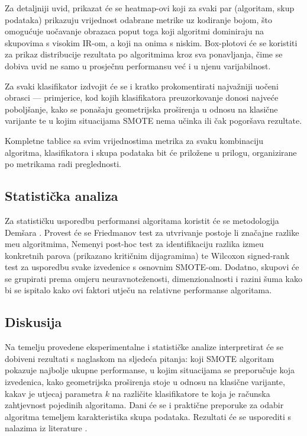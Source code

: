 Za detaljniji uvid, prikazat \'{c}e se heatmap-ovi koji za svaki par
(algoritam, skup podataka) prikazuju vrijednost odabrane metrike uz
kodiranje bojom, \v{s}to omogu\'{c}uje uo\v{c}avanje obrazaca poput
toga koji algoritmi dominiraju na skupovima s visokim IR-om, a koji na
onima s niskim. Box-plotovi \'{c}e se koristiti za prikaz distribucije
rezultata po algoritmima kroz sva ponavljanja, \v{c}ime se dobiva uvid
ne samo u prosje\v{c}nu performansu ve\'{c} i u njenu varijabilnost.

Za svaki klasifikator izdvojit \'{c}e se i kratko prokomentirati
najva\v{z}niji uo\v{c}eni obrasci --- primjerice, kod kojih klasifikatora
preuzorkovanje donosi najve\'{c}e pobolj\v{s}anje, kako se pona\v{s}aju
geometrijska pro\v{s}irenja u odnosu na klasi\v{c}ne varijante te u kojim
situacijama SMOTE nema u\v{c}inka ili \v{c}ak pogor\v{s}ava rezultate.

Kompletne tablice sa svim vrijednostima metrika za svaku kombinaciju
algoritma, klasifikatora i skupa podataka bit \'{c}e prilo\v{z}ene u
prilogu, organizirane po metrikama radi preglednosti.


\subsection{Statisti\v{c}ka analiza}

Za statisti\v{c}ku usporedbu performansi algoritama koristit \'{c}e se
metodologija Dem\v{s}ara \cite{demsar2006}. Provest \'{c}e se
Friedmanov test za utvr\dj{}ivanje postoje li zna\v{c}ajne razlike
me\dj{}u algoritmima, Nemenyi post-hoc test za identifikaciju razlika
izme\dj{}u konkretnih parova (prikazano kriti\v{c}nim dijagramima) te
Wilcoxon signed-rank test za usporedbu svake izvedenice s osnovnim
SMOTE-om. Dodatno, skupovi \'{c}e se grupirati prema omjeru
neuravnote\v{z}enosti, dimenzionalnosti i razini \v{s}uma kako bi se
ispitalo kako ovi faktori utje\v{c}u na relativne performanse
algoritama.

\subsection{Diskusija}

Na temelju provedene eksperimentalne i statisti\v{c}ke analize
interpretirat \'{c}e se dobiveni rezultati s naglaskom na sljede\'{c}a
pitanja: koji SMOTE algoritam pokazuje najbolje ukupne performanse,
u kojim situacijama se preporu\v{c}uje koja izvedenica, kako
geometrijska pro\v{s}irenja stoje u odnosu na klasi\v{c}ne varijante,
kakav je utjecaj parametra $k$ na razli\v{c}ite klasifikatore te koja
je ra\v{c}unska zahtjevnost pojedinih algoritama. Dani \'{c}e se i
prakti\v{c}ne preporuke za odabir algoritma temeljem karakteristika
skupa podataka. Rezultati \'{c}e se usporediti s nalazima iz literature
\cite{bajer2019,dudjak2020,kovacs2019,haixiang2017}.

